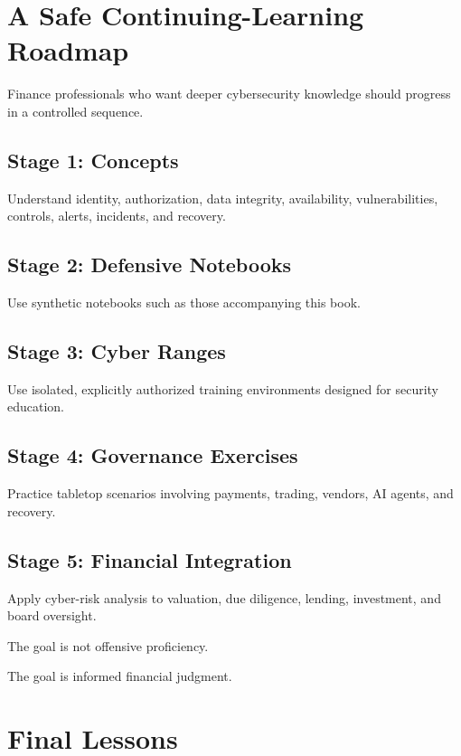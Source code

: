 \section{A Safe Continuing-Learning Roadmap}

Finance professionals who want deeper cybersecurity knowledge should progress in a controlled sequence.

\subsection{Stage 1: Concepts}

Understand identity, authorization, data integrity, availability, vulnerabilities, controls, alerts, incidents, and recovery.

\subsection{Stage 2: Defensive Notebooks}

Use synthetic notebooks such as those accompanying this book.

\subsection{Stage 3: Cyber Ranges}

Use isolated, explicitly authorized training environments designed for security education.

\subsection{Stage 4: Governance Exercises}

Practice tabletop scenarios involving payments, trading, vendors, AI agents, and recovery.

\subsection{Stage 5: Financial Integration}

Apply cyber-risk analysis to valuation, due diligence, lending, investment, and board oversight.

The goal is not offensive proficiency.

The goal is informed financial judgment.

\section{Final Lessons}

